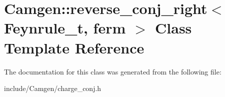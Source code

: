 \hypertarget{a00477}{}\section{Camgen\+:\+:reverse\+\_\+conj\+\_\+right$<$ Feynrule\+\_\+t, ferm $>$ Class Template Reference}
\label{a00477}


The documentation for this class was generated from the following file\+:\begin{DoxyCompactItemize}
\item 
include/\+Camgen/charge\+\_\+conj.\+h\end{DoxyCompactItemize}
